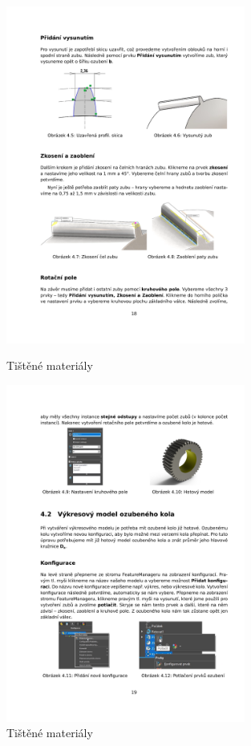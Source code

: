 \begin{figure}[htbp]
    \centering
    \begin{minipage}[b]{0.45\textwidth}
        \centering
        \includegraphics[width=0.7\textwidth]{img/020/guide1.png}
        \caption{Tištěné materiály}
        \label{fig:auxmat1}
    \end{minipage}
    \qquad
    \begin{minipage}[b]{0.45\textwidth}
        \centering
        \includegraphics[width=0.7\textwidth]{img/020/guide2.png}
        \caption{Tištěné materiály}
        \label{fig:auxmat2}
    \end{minipage}
\end{figure}

